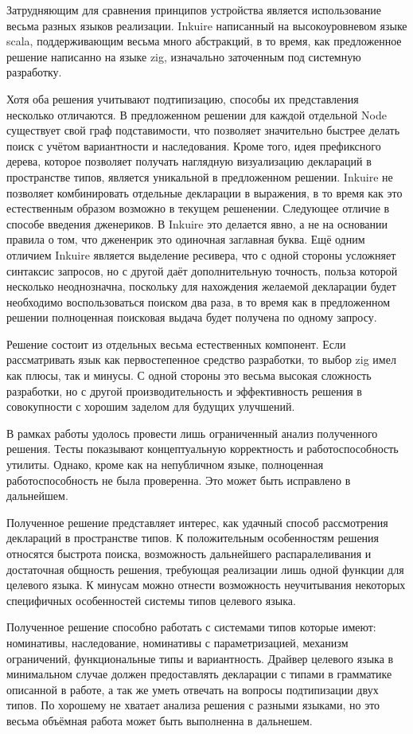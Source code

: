 \documentclass[times]{itmo-student-thesis}
\begin{document}
	Затрудняющим для сравнения принципов устройства является использование весьма разных языков реализации. Inkuire написанный на высокоуровневом языке scala, поддерживающим весьма много абстракций, в то время, как предложенное решение написанно на языке zig, изначально заточенным под системную разработку. 
	
	Хотя оба решения учитывают подтипизацию, способы их представления несколько отличаются. В предложенном решении для каждой отдельной Node существует свой граф подставимости, что позволяет значительно быстрее делать поиск с учётом вариантности и наследования. Кроме того, идея префиксного дерева, которое позволяет получать наглядную визуализацию деклараций в пространстве типов, является уникальной в предложенном решении. Inkuire не позволяет комбинировать отдельные декларации в выражения, в то время как это естественным образом возможно в текущем решенении. Следующее отличие в способе введения дженериков. В Inkuire это делается явно, а не на основании правила о том, что джененрик это одиночная заглавная буква. Ещё одним отличием Inkuire является выделение ресивера, что с одной стороны усложняет синтаксис запросов, но с другой даёт дополнительную точность, польза которой несколько неоднозначна, поскольку для нахождения желаемой декларации будет необходимо воспользоваться поиском два раза, в то время как в предложенном решении полноценная поисковая выдача будет получена по одному запросу.
	
	\chapterconclusion
	Решение состоит из отдельных весьма естественных компонент. Если рассматривать язык как первостепенное средство разработки, то выбор zig имел как плюсы, так и минусы. С одной стороны это весьма высокая сложность разработки, но с другой производительность и эффективность решения в совокупности с хорошим заделом для будущих улучшений.
	
	В рамках работы удолось провести лишь ограниченный анализ полученного решения. Тесты показывают концептуальную корректность и работоспособность утилиты. Однако, кроме как на непубличном языке, полноценная работоспособность не была проверенна. Это может быть исправлено в дальнейшем.
	
	\startconclusionpage
	Полученное решение представляет интерес, как удачный способ рассмотрения деклараций в пространстве типов. К положительным особенностям решения относятся быстрота поиска, возможность дальнейшего распаралеливания и достаточная общность решения, требующая реализации лишь одной функции для целевого языка. К минусам можно отнести возможность неучитывания некоторых специфичных особенностей системы типов целевого языка.
	
	Полученное решение способно работать с системами типов которые имеют: номинативы, наследование, номинативы с параметризацией, механизм ограничений, функциональные типы и вариантность. Драйвер целевого языка в минимальном случае должен предоставлять декларации с типами в грамматике описанной в работе, а так же уметь отвечать на вопросы подтипизации двух типов. По хорошему не хватает анализа решения с разными языками, но это весьма объёмная работа может быть выполненна в дальнешем.

	
	\printmainbibliography
	
\end{document}

